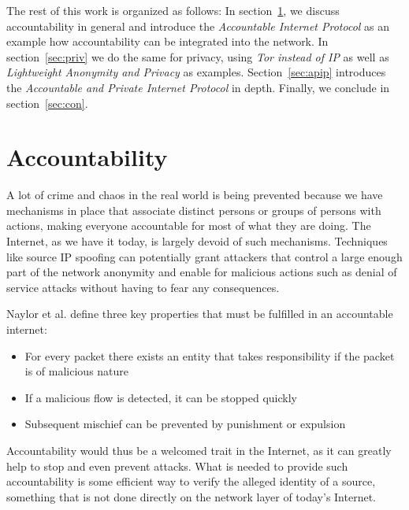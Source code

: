 \documentclass{acm_proc_article-sp}
\begin{document}
The rest of this work is organized as follows: In section~\ref{sec:acc}, we discuss accountability in general and introduce the \emph{Accountable Internet Protocol} as an example how accountability can be integrated into the network. In section~\ref{sec:priv} we do the same for privacy, using \emph{Tor instead of IP} as well as \emph{Lightweight Anonymity and Privacy} as examples. Section~\ref{sec:apip} introduces the \emph{Accountable and Private Internet Protocol} in depth. Finally, we conclude in section~\ref{sec:con}.



\section{Accountability}
\label{sec:acc}
A lot of crime and chaos in the real world is being prevented because we have mechanisms in place that associate distinct persons or groups of persons with actions, making everyone accountable for most of what they are doing. The Internet, as we have it today, is largely devoid of such mechanisms. Techniques like source IP spoofing can potentially grant attackers that control a large enough part of the network anonymity and enable for malicious actions such as denial of service attacks without having to fear any consequences.

Naylor et al. \cite{apip} define three key properties that must be fulfilled in an accountable internet:

\begin{itemize}
\item For every packet there exists an entity that takes responsibility if the packet is of malicious nature
\item If a malicious flow is detected, it can be stopped quickly
\item Subsequent mischief can be prevented by punishment or expulsion
\end{itemize}

Accountability would thus be a welcomed trait in the Internet, as it can greatly help to stop and even prevent attacks. What is needed to provide such accountability is some efficient way to verify the alleged identity of a source, something that is not done directly on the network layer of today's Internet. 
\end{document}
